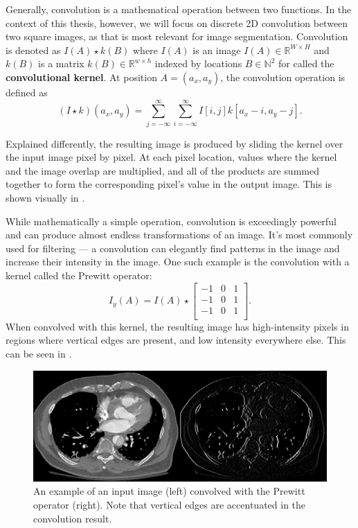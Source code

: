 Generally, convolution is a mathematical operation between two functions. In the context of this thesis, however, we will focus on discrete 2D convolution between two square images, as that is most relevant for image segmentation. Convolution is denoted as $I(A) \star k(B)$ where $I(A)$ is an image $I(A) \in \mathbb{R}^{W \times H}$ and $k(B)$ is a matrix $k(B) \in \mathbb{R}^{w \times h}$ indexed by locations $B \in \mathbb{N}^2$ for called the \textbf{convolutional kernel}. At position $A = (a_x, a_y)$, the convolution operation is defined as
\begin{equation}
(I \star k)(a_x, a_y) = \sum_{j=-\infty}^{\infty} \sum_{i=-\infty}^{\infty} I[i, j] k[a_x - i, a_y - j].
\end{equation}

Explained differently, the resulting image is produced by sliding the kernel over the input image pixel by pixel. At each pixel location, values where the kernel and the image overlap are multiplied, and all of the products are summed together to form the corresponding pixel's value in the output image. This is shown visually in .

While mathematically a simple operation, convolution is exceedingly powerful and can produce almost endless transformations of an image. It's most commonly used for filtering --- a convolution can elegantly find patterns in the image and increase their intensity in the image. One such example is the convolution with a kernel called the Prewitt operator:
\begin{equation}
I_y(A) = I(A) \star \begin{bmatrix}
-1 & 0 & 1\\
-1 & 0 & 1\\
-1 & 0 & 1\\
\end{bmatrix}.
\end{equation}
When convolved with this kernel, the resulting image has high-intensity pixels in regions where vertical edges are present, and low intensity everywhere else. This can be seen in .

\begin{figure}[b!]
 \centering
 \includegraphics[width=\linewidth]{images/prewitt-example.png}
 \caption{An example of an input image (left) convolved with the Prewitt operator (right). Note that vertical edges are accentuated in the convolution result.}
 \label{fig:prewitt-example}
 \end{figure}

